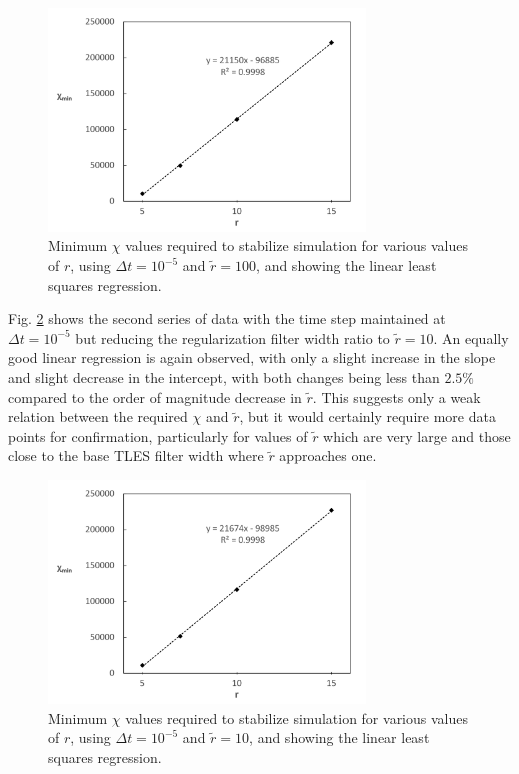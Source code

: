 \begin{figure}[!tb]
\centering
\includegraphics[width=0.75\textwidth]{figures/min_chi_dt5_r100.pdf}
\caption{Minimum $\chi$ values required to stabilize simulation for various values of $r$, using $\Delta t=10^{-5}$ and $\tilde{r}=100$, and showing the linear least squares regression.}
\label{fig:min_chi_dt5_r100}
\end{figure}

Fig. \ref{fig:min_chi_dt5_r10} shows the second series of data  with the time step maintained at $\Delta t=10^{-5}$ but reducing the regularization filter width ratio to $\tilde{r}=10$. An equally good linear regression is again observed, with only a slight increase in the slope and slight decrease in the intercept, with both changes being less than $2.5\%$ compared to the order of magnitude decrease in $\tilde{r}$. This suggests only a weak relation between the required $\chi$ and $\tilde{r}$, but it would certainly require more data points for confirmation, particularly for values of $\tilde{r}$ which are very large and those close to the base TLES filter width where $\tilde{r}$ approaches one.

\begin{figure}[!tb]
\centering
\includegraphics[width=0.75\textwidth]{figures/min_chi_dt5_r10.pdf}
\caption{Minimum $\chi$ values required to stabilize simulation for various values of $r$, using $\Delta t=10^{-5}$ and $\tilde{r}=10$, and showing the linear least squares regression.}
\label{fig:min_chi_dt5_r10}
\end{figure}

